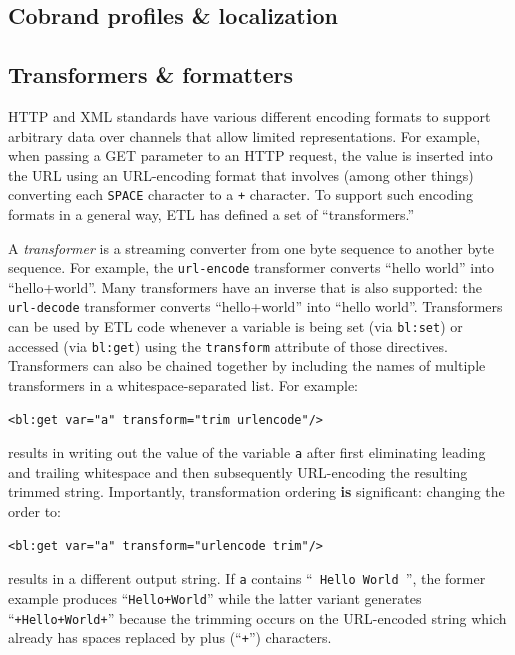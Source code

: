 \documentclass{www2003-submission}
\newcommand{\smtexttt}[1]{{\small\texttt{#1}}}
\begin{document}
\subsection{Cobrand profiles \& localization}


\subsection{Transformers \& formatters}

HTTP and XML standards have various different encoding formats to
support arbitrary data over channels that allow limited
representations.  For example, when passing a GET parameter to an HTTP
request, the value is inserted into the URL using an URL-encoding format
that involves (among other things) converting each \smtexttt{SPACE}
character to a \smtexttt{+} character.  To support such encoding formats
in a general way, ETL has defined a set of ``transformers.''  

A \emph{transformer} is a streaming converter from one byte sequence to
another byte sequence.  For example, the \smtexttt{url-encode}
transformer converts ``hello world'' into ``hello+world''.  Many
transformers have an inverse that is also supported: the
\smtexttt{url-decode} transformer converts ``hello+world'' into ``hello
world''.  Transformers can be used by ETL code whenever a variable is
being set (via \smtexttt{bl:set}) or accessed (via \smtexttt{bl:get})
using the \smtexttt{transform} attribute of those directives.
Transformers can also be chained together by including the names of
multiple transformers in a whitespace-separated list.  For example:

\begin{verbatim}
<bl:get var="a" transform="trim urlencode"/>
\end{verbatim}

\noindent results in writing out the value of the variable \smtexttt{a}
after first eliminating leading and trailing whitespace and then
subsequently URL-encoding the resulting trimmed string.  Importantly,
transformation ordering \textbf{is} significant: changing the order to:

\begin{verbatim}
<bl:get var="a" transform="urlencode trim"/>
\end{verbatim}

\noindent results in a different output string.  If \smtexttt{a} contains
``\smtexttt{ Hello World }'', the former example produces ``\smtexttt{Hello+World}'' while
the latter variant generates ``\smtexttt{+Hello+World+}'' because the
trimming occurs on the URL-encoded string which already has spaces
replaced by plus (``\smtexttt{+}'') characters.
\end{document}
